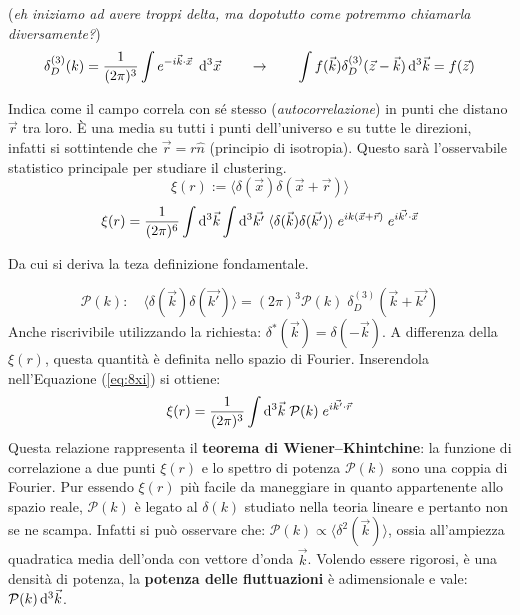 \vspace{2em}
\begin{example}
    (\textit{eh iniziamo ad avere troppi delta, ma dopotutto come potremmo chiamarla diversamente?})
    \begin{equation}
        \delta_D^{(3)}(k)= \frac{1}{(2\pi)^3} \int e^{-i\vec{k}\cdot\vec{x}}\; \operatorname{d}\!{^3 \vec{x}}\qquad \rightarrow\qquad \int f(\vec{k}) \delta_D^{(3)}( \vec{z}-\vec{k} )\operatorname{d}\!{^3 \vec{k}}= f(\vec{z})
    \end{equation}
\end{example}

\begin{example}
    Indica come il campo correla con sé stesso (\textit{autocorrelazione}) in punti che distano $\vec{r}$ tra loro. È una media su tutti i punti dell'universo e su tutte le direzioni, infatti si sottintende che $\vec{r}=r\hat{n}$ (principio di isotropia). Questo sarà l'osservabile statistico principale per studiare il clustering.
    \begin{equation}
        \xi (r) := \langle\delta (\vec{x}) \delta(\vec{x}+\vec{r}) \rangle 
    \end{equation}
    \begin{equation}
        \xi (r)= \frac{1}{(2\pi)^6}\int \operatorname{d}\!{^3\vec{k}}\int \operatorname{d}\!{^3\vec{k'}}\; \langle \delta (\vec{k}) \delta(\vec{k'})\rangle \; e^{ik(\vec{x}+\vec{r})}\; e^{i\vec{k'}\cdot \vec{x}}\label{eq:8xi}
    \end{equation}
\end{example}
Da cui si deriva la teza definizione fondamentale.

\begin{example}

    \begin{equation}
        \mathcal{P}(k): \quad \langle \delta (\vec{k}) \delta(\vec{k'})\rangle = (2\pi)^3 \mathcal{P}(k)\; \delta_D^{(3)}(\vec{k}+\vec{k'})\label{eq:8pi}
    \end{equation}
    Anche riscrivibile utilizzando la richiesta: $\delta^*(\vec{k})=\delta{(-\vec{k})}$. A differenza della $\xi(r)$, questa quantità è definita nello spazio di Fourier. Inserendola nell'Equazione (\ref{eq:8xi}) si ottiene:
    \begin{equation}
        \xi (r) = \frac{1}{(2\pi)^3} \int \operatorname{d}\!{^3\vec{k}}\; \mathcal{P}(k)\; e^{i\vec{k'}\cdot \vec{r}}
    \end{equation}
    Questa relazione rappresenta il \textbf{teorema di Wiener–Khintchine}: la funzione di correlazione a due punti $\xi (r)$  e lo spettro di potenza $\mathcal{P}(k)$ sono una coppia di Fourier. Pur essendo $\xi (r)$ più facile da maneggiare in quanto appartenente allo spazio reale, $\mathcal{P}(k)$ è legato al $\delta (k)$ studiato nella teoria lineare e pertanto non se ne scampa. Infatti si può osservare che: $\mathcal{P}(k)\propto \langle\delta^2 (\vec{k})  \rangle $, ossia all'ampiezza quadratica media dell'onda con vettore d'onda $\vec{k}$. Volendo essere rigorosi, è una densità di potenza, la \textbf{potenza delle fluttuazioni} è adimensionale e vale: $\mathcal{P}(k)\operatorname{d}\!{^3 \vec{k}}$.
\end{example}

